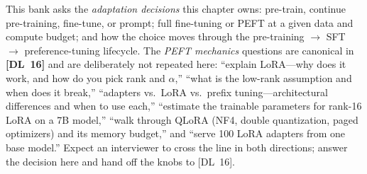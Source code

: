 \begin{keyinsight}
This bank asks the \emph{adaptation decisions} this chapter owns: pre-train,
continue pre-training, fine-tune, or prompt; full fine-tuning or PEFT at a given
data and compute budget; and how the choice moves through the pre-training
$\to$ SFT $\to$ preference-tuning lifecycle.  The \emph{PEFT mechanics}
questions are canonical in \textbf{[DL~16]} and are deliberately not repeated
here: ``explain LoRA---why does it work, and how do you pick rank and
$\alpha$,'' ``what is the low-rank assumption and when does it break,''
``adapters vs.\ LoRA vs.\ prefix tuning---architectural differences and when to
use each,'' ``estimate the trainable parameters for rank-16 LoRA on a 7B
model,'' ``walk through QLoRA (NF4, double quantization, paged optimizers) and
its memory budget,'' and ``serve 100 LoRA adapters from one base model.''
Expect an interviewer to cross the line in both directions; answer the decision
here and hand off the knobs to [DL~16].
\end{keyinsight}


